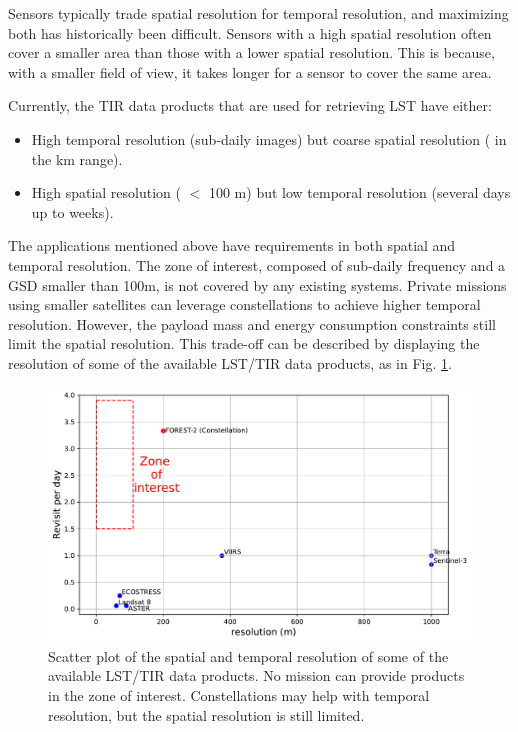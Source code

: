         Sensors typically trade spatial resolution for temporal resolution, and maximizing both has historically been difficult.
        Sensors with a high spatial resolution often cover a smaller area than those with a lower spatial resolution.
        This is because, with a smaller field of view, it takes longer for a sensor to cover the same area. 

       Currently, the TIR data products that are used for retrieving LST have either: 
        
        \begin{itemize}
            \item High temporal resolution (sub-daily images) but coarse spatial resolution ( in the km range).
            \item High spatial resolution ( $<$ 100 m) but low temporal resolution (several days up to weeks).
        \end{itemize}

        The applications mentioned above have requirements in both spatial and temporal resolution. 
        The zone of interest, composed of sub-daily frequency and a GSD smaller than 100m, is not covered by any existing systems.
        Private missions using smaller satellites can leverage constellations to achieve higher temporal resolution.
        However, the payload mass and energy consumption constraints still limit the spatial resolution.
        This trade-off can be described by displaying the resolution of some of the available LST/TIR data products, as in Fig. \ref{fig:1-spatio-temporal-trade-off}. 

        \begin{figure}[H]
            \centering
            \includegraphics[width=\textwidth]{Includes/2-scatterplot-res-revisit.pdf}
            \caption{Scatter plot of the spatial and temporal resolution of some of the available LST/TIR data products. No mission can provide products in the zone of interest. Constellations may help with temporal resolution, but the spatial resolution is still limited.}
            \label{fig:1-spatio-temporal-trade-off}
        \end{figure}

